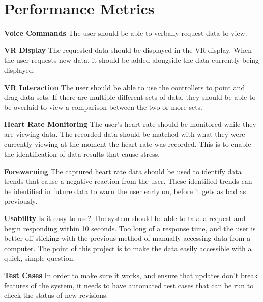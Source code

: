 \documentclass[onecolumn, draftclsnofoot,10pt, compsoc, letterpaper]{IEEEtran}
\begin{document}
\section{Performance Metrics}
\begin{description}
\item \textbf{Voice Commands} The user should be able to verbally request data to view. 
\item \textbf{VR Display} The requested data should be displayed in the VR display. When the user requests new data, it should be added alongside the data currently being displayed.
\item \textbf{VR Interaction} The user should be able to use the controllers to point and drag data sets. If there are multiple different sets of data, they should be able to be overlaid to view a comparison between the two or more sets. 
\item \textbf{Heart Rate Monitoring} The user's heart rate should be monitored while they are viewing data. The recorded data should be matched with what they were currently viewing at the moment the heart rate was recorded. This is to enable the identification of data results that cause stress.
\item \textbf{Forewarning} The captured heart rate data should be used to identify data trends that cause a negative reaction from the user. These identified trends can be identified in future data to warn the user early on, before it gets as bad as previously.
\item \textbf{Usability} Is it easy to use? The system should be able to take a request and begin responding within 10 seconds. Too long of a response time, and the user is better off sticking with the previous method of manually accessing data from a computer. The point of this project is to make the data easily accessible with a quick, simple question.
\item \textbf{Test Cases} In order to make sure it works, and ensure that updates don't break features of the system, it needs to have automated test cases that can be run to check the status of new revisions. 
\end{description}
\end{document}

